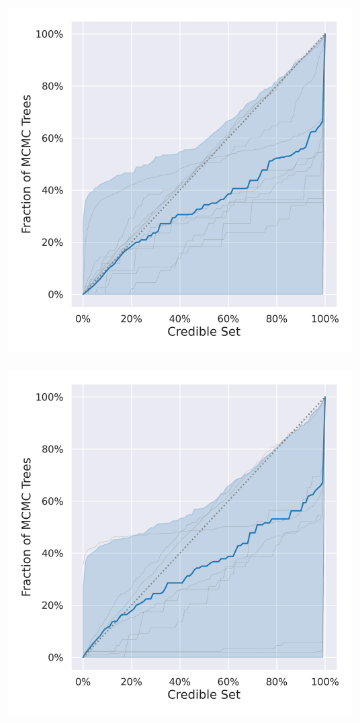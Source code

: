 \documentclass[10pt,letterpaper]{article}
\begin{document}
\begin{figure}
	\begin{subfigure}[b]{0.4\textwidth}
		\centering
		\includegraphics[width=\textwidth]{figures/bio-ccd1-credible-sets-Shortest Branch (Gamma).png}
	\end{subfigure}
	\begin{subfigure}[b]{0.4\textwidth}
		\centering
		\includegraphics[width=\textwidth]{figures/bio-ccd1-credible-sets-Last Divergence (Gamma), Branches (Gamma).png}
	\end{subfigure}
	
	\label{fig:credible-regions}
\end{figure}
\end{document}
